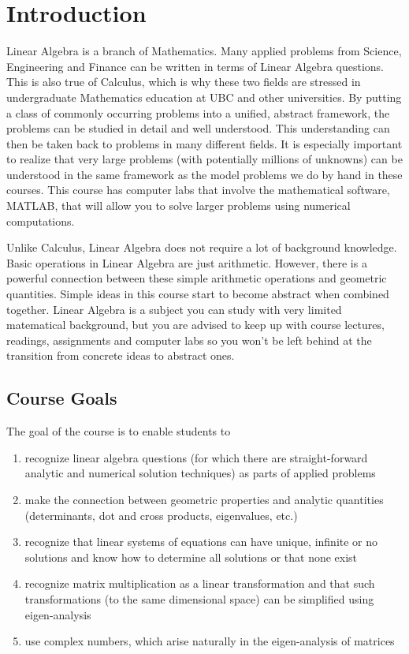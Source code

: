 \chapter{Introduction}

Linear Algebra is a branch of Mathematics. Many applied problems from
Science, Engineering and Finance can be written in terms of Linear
Algebra questions. This is also true of Calculus, which is why these
two fields are stressed in undergraduate Mathematics education at UBC
and other universities. By putting a class of commonly occurring
problems into a unified, abstract framework, the problems can be
studied in detail and well understood. This understanding can then be
taken back to problems in many different fields. It is especially
important to realize that very large problems (with potentially
millions of unknowns) can be understood in the same framework as the
model problems we do by hand in these courses. This course has
computer labs that involve the mathematical software, MATLAB, that
will allow you to solve larger problems using numerical computations. 

Unlike Calculus, Linear Algebra does not require a lot of background
knowledge. Basic operations in Linear Algebra are just
arithmetic. However, there is a powerful connection between these
simple arithmetic operations and geometric quantities. Simple ideas in
this course start to become abstract when combined together. Linear
Algebra is a subject you can study with very limited matematical 
background, but
you are advised to keep up with course lectures, readings, assignments
and computer labs so you won't be left behind at the transition from
concrete ideas to abstract ones.

\section{Course Goals}

The goal of the course is to enable students to 
\begin{enumerate}
\item recognize linear algebra questions (for which there are
straight-forward analytic and numerical solution techniques) as parts
of applied problems
\item make the connection between geometric properties and analytic
quantities (determinants, dot and cross products, eigenvalues, etc.)
\item recognize that linear systems of equations can have unique,
infinite or no solutions and know how to determine all solutions or
that none exist
\item recognize matrix multiplication as a linear transformation and
that such transformations (to the same dimensional space) can be
simplified using eigen-analysis
\item use complex numbers, which arise naturally in the eigen-analysis
of matrices
\end{enumerate}


